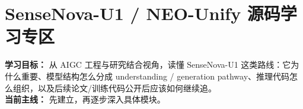 
\section*{SenseNova-U1 / NEO-Unify 源码学习专区}
{}

\begin{conceptbox}
\textbf{学习目标：} 从 AIGC 工程与研究结合视角，读懂 SenseNova-U1 这类路线：它为什么重要、模型结构怎么分成 understanding / generation pathway、推理代码怎么组织，以及后续论文/训练代码公开后应该如何继续追。\\
\textbf{当前主线：} 先建立，再逐步深入具体模块。
\end{conceptbox}






